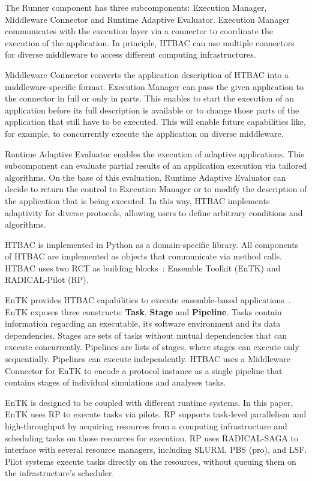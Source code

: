 The Runner component has three subcomponents: Execution Manager, Middleware
Connector and Runtime Adaptive Evaluator. Execution Manager communicates with
the execution layer via a connector to coordinate the execution of the
application. In principle, HTBAC can use multiple connectors for diverse
middleware to access different computing infrastructures.

Middleware Connector converts the application description of HTBAC into a
middleware-specific format. Execution Manager can pass the given application
to the connector in full or only in parts. This enables to start the
execution of an application before its full description is available or to
change those parts of the application that still have to be executed. This
will enable future capabilities like, for example, to concurrently execute
the application on diverse middleware.

Runtime Adaptive Evaluator enables the execution of adaptive applications.
This subcomponent can evaluate partial results of an application execution
via tailored algorithms. On the base of this evaluation, Runtime Adaptive
Evaluator can decide to return the control to Execution Manager or to modify
the description of the application that is being executed. In this way, HTBAC
implements adaptivity for diverse protocols, allowing users to define
arbitrary conditions and algorithms.

HTBAC is implemented in Python as a domain-specific library. All components
of HTBAC are implemented as objects that communicate via method calls. HTBAC
uses two RCT as building blocks~\cite{review_bb_2016}: Ensemble Toolkit
(EnTK) and RADICAL-Pilot (RP).

EnTK provides HTBAC capabilities to execute ensemble-based
applications~\cite{power-of-many17}. EnTK exposes three constructs:
\textbf{Task}, \textbf{Stage} and \textbf{Pipeline}. Tasks contain
information regarding an executable, its software environment and its data
dependencies. Stages are sets of tasks without mutual dependencies that can
execute concurrently. Pipelines are lists of stages, where stages can execute
only sequentially. Pipelines can execute independently. HTBAC uses a
Middleware Connector for EnTK to encode a protocol instance as a single
pipeline that contains stages of individual simulations and analyses tasks.

EnTK is designed to be coupled with different runtime systems. In this paper,
EnTK uses RP to execute tasks via pilots. RP supports task-level parallelism
and high-throughput by acquiring resources from a computing infrastructure
and scheduling tasks on those resources for execution. RP uses RADICAL-SAGA
to interface with several resource managers, including SLURM, PBS (pro), and
LSF. Pilot systems execute tasks directly on the resources, without queuing
them on the infrastructure's scheduler.

